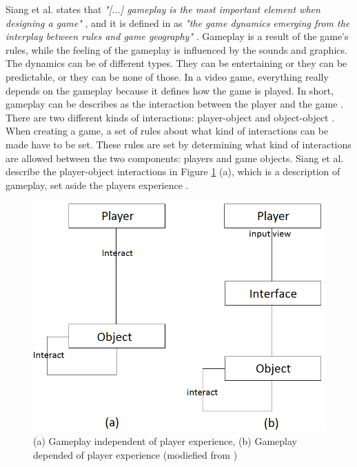 Siang et al. states that \emph{"[...] gameplay is the most important element when designing a game"} \cite{umlapproach}, and it is defined in \cite{understandingvg} as \emph{"the game dynamics emerging from the interplay between rules and game geography"} . Gameplay is a result of the game's rules, while the feeling of the gameplay is influenced by the sounds and graphics. The dynamics can be of different types. They can be entertaining or they can be predictable, or they can be none of those. In a video game, everything really depends on the gameplay because it defines how the game is played. In short, gameplay can be describes as the interaction between the player and the game \cite{umlapproach}. There are two different kinds of interactions: player-object and object-object \cite{umlapproach}. When creating a game, a set of rules about what kind of interactions can be made have to be set. These rules are set by determining what kind of interactions are allowed between the two components: players and game objects. Siang et al. describe the player-object interactions in Figure \ref{fig:playerobject} (a), which is a description of gameplay, set aside the players experience \cite{umlapproach}.
\begin{figure}
\begin{center}
\includegraphics[scale=0.4]{player-object-merged}
\caption[The player-token interaction]{(a) Gameplay independent of player experience, (b) Gameplay depended of player experience (modiefied from \cite{umlapproach})}
\label{fig:playerobject}
\end{center}
\end{figure} 


